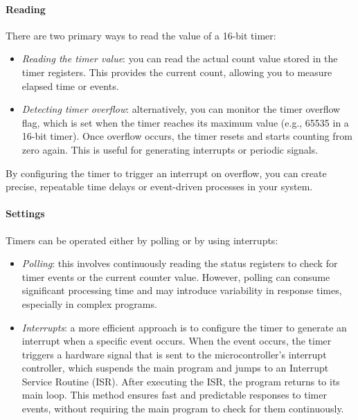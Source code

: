 \paragraph*{Reading}
There are two primary ways to read the value of a 16-bit timer:
\begin{itemize}
    \item \textit{Reading the timer value}: you can read the actual count value stored in the timer registers. 
        This provides the current count, allowing you to measure elapsed time or events.
    \item \textit{Detecting timer overflow}: alternatively, you can monitor the timer overflow flag, which is set when the timer reaches its maximum value (e.g., 65535 in a 16-bit timer). 
        Once overflow occurs, the timer resets and starts counting from zero again.
        This is useful for generating interrupts or periodic signals.
\end{itemize}
By configuring the timer to trigger an interrupt on overflow, you can create precise, repeatable time delays or event-driven processes in your system.

\paragraph*{Settings}
Timers can be operated either by polling or by using interrupts:
\begin{itemize}
    \item \textit{Polling}: this involves continuously reading the status registers to check for timer events or the current counter value. 
        However, polling can consume significant processing time and may introduce variability in response times, especially in complex programs.
    \item \textit{Interrupts}: a more efficient approach is to configure the timer to generate an interrupt when a specific event occurs. 
        When the event occurs, the timer triggers a hardware signal that is sent to the microcontroller's interrupt controller, which suspends the main program and jumps to an Interrupt Service Routine (ISR).
        After executing the ISR, the program returns to its main loop. 
        This method ensures fast and predictable responses to timer events, without requiring the main program to check for them continuously.
\end{itemize}

